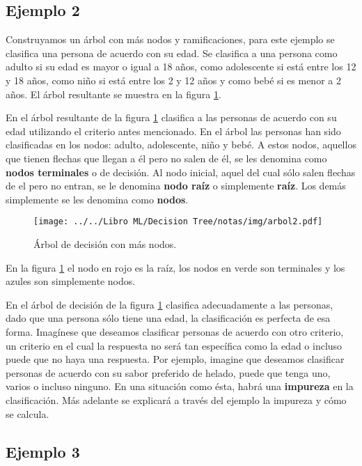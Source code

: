 \documentclass[
10pt, %
a4paper, %
]{article}
\begin{document}
\subsection{Ejemplo 2}

Construyamos un árbol con más nodos y ramificaciones, para este ejemplo se clasifica una persona de acuerdo con su edad. Se clasifica a una persona como adulto si su 
edad es mayor o igual a 18 años, como adolescente si está entre los 12 y 18 años, como niño si está entre los 2 y 12 años y como bebé si es menor a 2 años. El árbol 
resultante se muestra en la figura \ref{fig:arbol2}.

En el árbol resultante de la figura \ref{fig:arbol2} clasifica a las personas de acuerdo con su edad utilizando el criterio antes mencionado. En el árbol las personas 
han sido clasificadas en los nodos: adulto, adolescente, niño y bebé. A estos nodos, aquellos que tienen flechas que llegan a él pero no salen de él, se les denomina 
como \textbf{nodos terminales} o de decisión. Al nodo inicial, aquel del cual sólo salen flechas de el pero no entran, se le denomina \textbf{nodo raíz} o simplemente
\textbf{raíz}. Los demás simplemente se les denomina como \textbf{nodos}. 

\begin{figure}[H]
	\centering
	\texttt{[image: ../../Libro ML/Decision Tree/notas/img/arbol2.pdf]}
	\caption{Árbol de decisión con más nodos.}
	\label{fig:arbol2}
\end{figure}

En la figura \ref{fig:arbol2} el nodo en rojo es la raíz, los nodos en verde son terminales y los azules son simplemente nodos.

En el árbol de decisión de la figura \ref{fig:arbol2} clasifica adecuadamente a las personas, dado que una persona sólo tiene una edad, la clasificación es 
perfecta de esa forma. Imagínese que deseamos clasificar personas de acuerdo con otro criterio, un criterio en el cual la respuesta no será tan específica como la 
edad o incluso puede que no haya una respuesta. Por ejemplo, imagine que deseamos clasificar personas de acuerdo con su sabor preferido de helado, puede que tenga 
uno, varios o incluso ninguno.
En una situación como ésta, habrá una \textbf{impureza} en la clasificación. Más adelante se explicará a través del ejemplo la impureza y cómo se calcula.

\subsection{Ejemplo 3}
\end{document}
